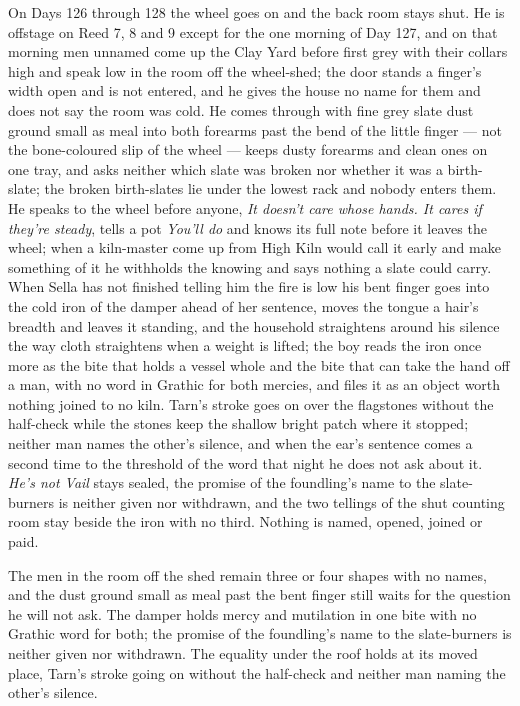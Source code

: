 \documentclass{design/chronicle}
\begin{document}
{On Days 126 through 128 the wheel goes on and the back room stays shut. He is offstage on Reed 7, 8 and 9 except for the one morning of Day 127, and on that morning men unnamed come up the Clay Yard before first grey with their collars high and speak low in the room off the wheel-shed; the door stands a finger’s width open and is not entered, and he gives the house no name for them and does not say the room was cold. He comes through with fine grey slate dust ground small as meal into both forearms past the bend of the little finger — not the bone-coloured slip of the wheel — keeps dusty forearms and clean ones on one tray, and asks neither which slate was broken nor whether it was a birth-slate; the broken birth-slates lie under the lowest rack and nobody enters them. He speaks to the wheel before anyone, \emph{It doesn’t care whose hands. It cares if they’re steady}, tells a pot \emph{You’ll do} and knows its full note before it leaves the wheel; when a kiln-master come up from High Kiln would call it early and make something of it he withholds the knowing and says nothing a slate could carry. When Sella has not finished telling him the fire is low his bent finger goes into the cold iron of the damper ahead of her sentence, moves the tongue a hair’s breadth and leaves it standing, and the household straightens around his silence the way cloth straightens when a weight is lifted; the boy reads the iron once more as the bite that holds a vessel whole and the bite that can take the hand off a man, with no word in Grathic for both mercies, and files it as an object worth nothing joined to no kiln. Tarn’s stroke goes on over the flagstones without the half-check while the stones keep the shallow bright patch where it stopped; neither man names the other’s silence, and when the ear’s sentence comes a second time to the threshold of the word that night he does not ask about it. \emph{He’s not Vail} stays sealed, the promise of the foundling’s name to the slate-burners is neither given nor withdrawn, and the two tellings of the shut counting room stay beside the iron with no third. Nothing is named, opened, joined or paid.

The men in the room off the shed remain three or four shapes with no names, and the dust ground small as meal past the bent finger still waits for the question he will not ask. The damper holds mercy and mutilation in one bite with no Grathic word for both; the promise of the foundling’s name to the slate-burners is neither given nor withdrawn. The equality under the roof holds at its moved place, Tarn’s stroke going on without the half-check and neither man naming the other’s silence.

}
\end{document}

